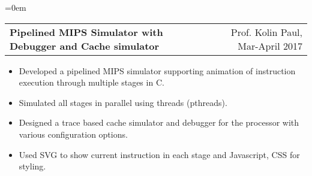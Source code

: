 \documentclass{article}
\makeatletter
\newcommand{\headerrow}[2]
{\begin{tabular*}{\linewidth}{l@{\extracolsep{\fill}}r}
    #1 &
    #2 \\
\end{tabular*}}
\makeatother
\begin{document}
\begin{list} {}{\leftmargin=0em}
    \item[]
    \headerrow {\textbf{Pipelined MIPS Simulator with Debugger and Cache simulator}}{Prof. Kolin Paul, Mar-April 2017}
    \begin{itemize}
    \setlength\itemsep{0.0em}
        \item Developed a pipelined MIPS simulator supporting animation of instruction execution through multiple stages in C.
        \item Simulated all stages in parallel using threads (pthreads).
        \item Designed a trace based cache simulator and debugger for the processor with various configuration options.
        \item Used SVG to show current instruction in each stage and Javascript, CSS for styling.
    \end{itemize}

\end{list}
\end{document}
